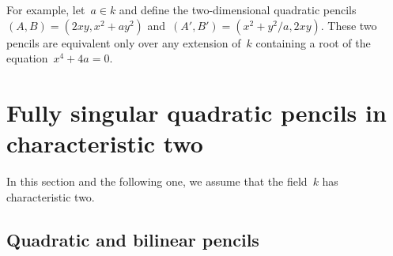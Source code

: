 \documentclass{lms}
\def\mat#1{\begin{pmatrix}#1\end{pmatrix}}
\DeclareMathOperator\Tr{Tr}
\begin{document}
For example, let~$a ∈ k$ and define the two-dimensional
quadratic pencils~$(A,B) = (2 x y, x^2 + a y^2)$
and~$(A', B') = (x^2 + y^2/a, 2 x y)$.
These two pencils are equivalent only over any extension of~$k$
containing a root of the equation~$x^4 + 4 a = 0$.
% 
% 



\section{Fully singular quadratic pencils in characteristic two}
\label{S:quad-sing}
In this section and the following one, we assume that the field~$k$ has
characteristic two.

\subsection{Quadratic and bilinear pencils}
\end{document}
